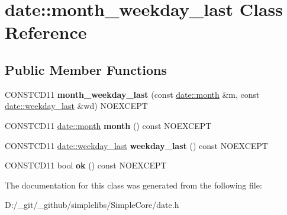 \hypertarget{classdate_1_1month__weekday__last}{}\section{date\+::month\+\_\+weekday\+\_\+last Class Reference}
\label{classdate_1_1month__weekday__last}
\subsection*{Public Member Functions}
\begin{DoxyCompactItemize}
\item 
\mbox{\label{classdate_1_1month__weekday__last_a0a9c7287de1f2eaead28716ae9c6c009}} 
C\+O\+N\+S\+T\+C\+D11 {\bfseries month\+\_\+weekday\+\_\+last} (const \mbox{\hyperlink{classdate_1_1month}{date\+::month}} \&m, const \mbox{\hyperlink{classdate_1_1weekday__last}{date\+::weekday\+\_\+last}} \&wd) N\+O\+E\+X\+C\+E\+PT
\item 
\mbox{\label{classdate_1_1month__weekday__last_ab669199f0ced62bd0a73b5e39c4f2bd7}} 
C\+O\+N\+S\+T\+C\+D11 \mbox{\hyperlink{classdate_1_1month}{date\+::month}} {\bfseries month} () const N\+O\+E\+X\+C\+E\+PT
\item 
\mbox{\label{classdate_1_1month__weekday__last_afe4f3b94bd3b1a4187ab06a2bc5abb10}} 
C\+O\+N\+S\+T\+C\+D11 \mbox{\hyperlink{classdate_1_1weekday__last}{date\+::weekday\+\_\+last}} {\bfseries weekday\+\_\+last} () const N\+O\+E\+X\+C\+E\+PT
\item 
\mbox{\label{classdate_1_1month__weekday__last_aa3d23862103ebd4a22652d4666d37c9c}} 
C\+O\+N\+S\+T\+C\+D11 bool {\bfseries ok} () const N\+O\+E\+X\+C\+E\+PT
\end{DoxyCompactItemize}


The documentation for this class was generated from the following file\+:\begin{DoxyCompactItemize}
\item 
D\+:/\+\_\+git/\+\_\+github/simplelibs/\+Simple\+Core/date.\+h\end{DoxyCompactItemize}
